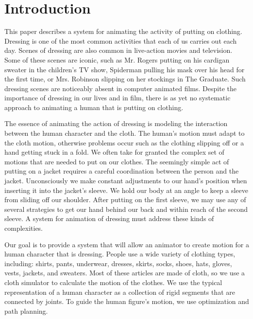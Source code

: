 \section{Introduction}

This paper describes a system for animating the activity of putting on
clothing.  Dressing is one of the most common activities that each of us
carries out each day.  Scenes of dressing are also common in live-action
movies and television.  Some of these scenes are iconic, such as Mr.
Rogers putting on his cardigan sweater in the children’s TV show,
Spiderman pulling his mask over his head for the first time, or Mrs.
Robinson slipping on her stockings in The Graduate.  Such dressing scenes
are noticeably absent in computer animated films.  Despite the importance
of dressing in our lives and in film, there is as yet no systematic
approach to animating a human that is putting on clothing.


The essence of animating the action of dressing is modeling the
interaction between the human character and the cloth.  The human's motion
must adapt to the cloth motion, otherwise problems occur such as the
clothing slipping off or a hand getting stuck in a fold.  We often take
for granted the complex set of motions that are needed to put on our
clothes.  The seemingly simple act of putting on a jacket requires a
careful coordination between the person and the jacket.  Unconsciously we
make constant adjustments to our hand’s position when inserting it into
the jacket’s sleeve.  We hold our body at an angle to keep a sleeve from
sliding off our shoulder.  After putting on the first sleeve, we may use
any of several strategies to get our hand behind our back and within reach
of the second sleeve.  A system for animation of dressing must address
these kinds of complexities.

Our goal is to provide a system that will allow an animator to create
motion for a human character that is dressing.  People use a wide variety
of clothing types, including: shirts, pants, underwear, dresses, skirts,
socks, shoes, hats, gloves, vests, jackets, and sweaters.  Most of these
articles are made of cloth, so we use a cloth simulator to calculate the
motion of the clothes.  We use the typical representation of a human
character as a collection of rigid segments that are connected by joints.
To guide the human figure's motion, we use optimization and path planning.

